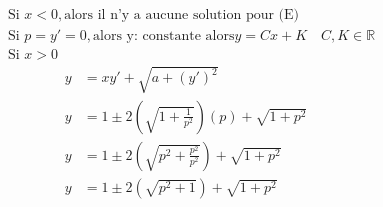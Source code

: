 \begin{align*}
    &\text{Si } x < 0, \text{alors il n'y a aucune solution pour (E)} \\
    &\text{Si } p = y' = 0, \text{alors  y: constante alors} y = Cx+K \quad C,K \in \mathbb{R} \\
    &\text{Si } x > 0
\end{align*}
\begin{align*}
    y &= xy' + \sqrt{a+(y')^2} \\
    y &= 1 \pm 2(\sqrt{1+\frac{1}{p^2}})(p) + \sqrt{1+p^2} \\
    y &= 1 \pm 2(\sqrt{p^2+\frac{p^2}{p^2}}) + \sqrt{1+p^2} \\
    y &= 1 \pm 2(\sqrt{p^2+ 1}) + \sqrt{1+p^2}
\end{align*}